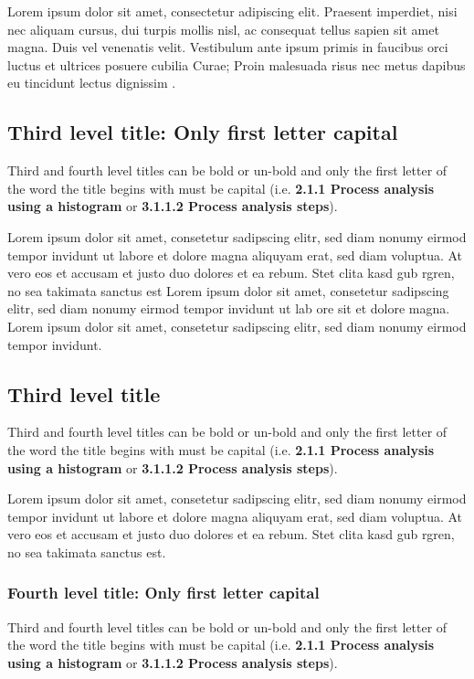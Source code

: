 Lorem ipsum dolor sit amet, consectetur adipiscing elit. Praesent imperdiet, nisi nec aliquam cursus, dui turpis mollis nisl, ac consequat tellus sapien sit amet magna. Duis vel venenatis velit. Vestibulum ante ipsum primis in faucibus orci luctus et ultrices posuere cubilia Curae; Proin malesuada risus nec metus dapibus eu tincidunt lectus dignissim \cite{1993JHyd..144..193B}.

\subsection{Third level title: Only first letter capital}

Third and fourth level titles can be bold or un-bold and only the first letter of the word the title begins with must be capital (i.e. \textbf{2.1.1 Process analysis using a histogram} or \textbf{3.1.1.2 Process analysis steps}).

Lorem ipsum dolor sit amet, consetetur sadipscing elitr, sed diam nonumy eirmod tempor invidunt ut labore et dolore magna aliquyam erat, sed diam voluptua. At vero eos et accusam et justo duo dolores et ea rebum. Stet clita kasd gub rgren, no sea takimata sanctus est Lorem ipsum dolor sit amet, consetetur sadipscing elitr, sed diam nonumy eirmod tempor invidunt ut lab ore sit et dolore magna. Lorem ipsum dolor sit amet, consetetur sadipscing elitr, sed diam nonumy eirmod tempor invidunt.

\subsection{Third level title}

Third and fourth level titles can be bold or un-bold and only the first letter of the word the title begins with must be capital (i.e. \textbf{2.1.1 Process analysis using a histogram} or \textbf{3.1.1.2 Process analysis steps}).

Lorem ipsum dolor sit amet, consetetur sadipscing elitr, sed diam nonumy eirmod tempor invidunt ut labore et dolore magna aliquyam erat, sed diam voluptua. At vero eos et accusam et justo duo dolores et ea rebum. Stet clita kasd gub rgren, no sea takimata sanctus est.

\subsubsection{Fourth level title: Only first letter capital}

Third and fourth level titles can be bold or un-bold and only the first letter of the word the title begins with must be capital (i.e. \textbf{2.1.1 Process analysis using a histogram} or \textbf{3.1.1.2 Process analysis steps}).


